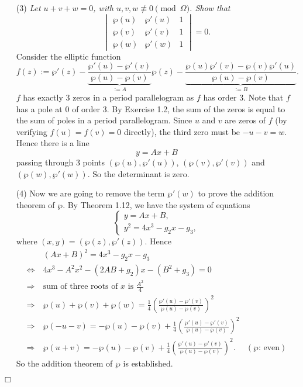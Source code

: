 \documentclass{article}
\begin{document}
\begin{enumerate}
\item[(3)]
  \emph{Let $u + v + w = 0$, with $u, v, w \not\equiv 0 \pmod{\Omega}$.
  Show that}
  \[
    \begin{vmatrix}
      \wp(u) & \wp'(u) & 1 \\
      \wp(v) & \wp'(v) & 1 \\
      \wp(w) & \wp'(w) & 1
    \end{vmatrix} = 0.
  \]
  Consider the elliptic function
  \[
    f(z) := \wp'(z)
      - \underbrace{\frac{\wp'(u)-\wp'(v)}{\wp(u)-\wp(v)}}_{:= A} \wp(z)
      - \underbrace{\frac{\wp(u)\wp'(v) - \wp(v)\wp'(u)}{\wp(u)-\wp(v)}}_{:= B}.
  \]
  $f$ has exactly $3$ zeros in a period parallelogram as $f$ has order $3$.
  Note that $f$ has a pole at $0$ of order $3$.
  By Exercise 1.2, the sum of the zeros is equal to the sum of poles in a period parallelogram.
  Since $u$ and $v$ are zeros of $f$ (by verifying $f(u) = f(v) = 0$ directly),
  the third zero must be $-u-v = w$.
  Hence there is a line
  \[
      y = A x + B
  \]
  passing through $3$ points $(\wp(u),\wp'(u))$, $(\wp(v),\wp'(v))$ and $(\wp(w),\wp'(w))$.
  So the determinant is zero.

\item[(4)]
  Now we are going to remove the term $\wp'(w)$ to prove the addition theorem of $\wp$.
  By Theorem 1.12, we have the system of equations
  \begin{equation*}
    \begin{cases}
       y = A x + B, \\
       y^2 = 4x^3 - g_2 x - g_3,
    \end{cases}
  \end{equation*}
  where $(x,y) = (\wp(z), \wp'(z))$.
  Hence
  \begin{align*}
    &\:
    (A x + B)^2 = 4x^3 - g_2 x - g_3 \\
    \Longleftrightarrow & \:
    4x^3 - A^2 x^2 - (2AB + g_2) x - (B^2 + g_3) = 0 \\
    \Longrightarrow & \:
    \text{sum of three roots of $x$ is $\frac{A^2}{4}$} \\
    \Longrightarrow & \:
    \wp(u) + \wp(v) + \wp(w) = \frac{1}{4}\left( \frac{\wp'(u)-\wp'(v)}{\wp(u)-\wp(v)} \right)^2 \\
    \Longrightarrow & \:
    \wp(-u-v) = - \wp(u) - \wp(v) + \frac{1}{4}\left( \frac{\wp'(u)-\wp'(v)}{\wp(u)-\wp(v)} \right)^2 \\
    \Longrightarrow & \:
    \wp(u+v) = - \wp(u) - \wp(v) + \frac{1}{4}\left( \frac{\wp'(u)-\wp'(v)}{\wp(u)-\wp(v)} \right)^2.
      &(\text{$\wp$: even})
  \end{align*}
  So the addition theorem of $\wp$ is established.
\end{enumerate}
$\Box$ \\
\end{document}
